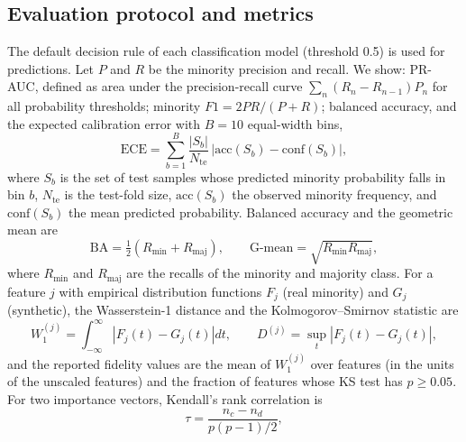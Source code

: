 \documentclass[conference]{IEEEtran}
\begin{document}
\subsection{Evaluation protocol and metrics}
The default decision rule of each classification model (threshold 0.5) is used for predictions. Let $P$ and $R$ be the minority precision and recall. We show: PR-AUC, defined as area under the precision-recall curve $\sum_n (R_n-R_{n-1})P_n$ for all probability thresholds; minority $F1 =2PR/(P+R)$; balanced accuracy, and the expected calibration error with $B=10$ equal-width bins,
\begin{equation}
\mathrm{ECE}=\sum_{b=1}^{B}\frac{|S_b|}{N_{\text{te}}}\,\big|\mathrm{acc}(S_b)-\mathrm{conf}(S_b)\big|,
\end{equation}
where $S_b$ is the set of test samples whose predicted minority probability falls in bin $b$, $N_{\text{te}}$ is the test-fold size, $\mathrm{acc}(S_b)$ the observed minority frequency, and $\mathrm{conf}(S_b)$ the mean predicted probability. Balanced accuracy and the geometric mean are
\begin{equation}
\mathrm{BA}=\tfrac{1}{2}(R_{\text{min}}+R_{\text{maj}}),\qquad \mathrm{G\text{-}mean}=\sqrt{R_{\text{min}}R_{\text{maj}}},
\end{equation}
where $R_{\text{min}}$ and $R_{\text{maj}}$ are the recalls of the minority and majority class. For a feature $j$ with empirical distribution functions $F_j$ (real minority) and $G_j$ (synthetic), the Wasserstein-1 distance and the Kolmogorov--Smirnov statistic are
\begin{equation}
W_1^{(j)}=\int_{-\infty}^{\infty}\left|F_j(t)-G_j(t)\right|dt,\qquad D^{(j)}=\sup_t\left|F_j(t)-G_j(t)\right|,
\end{equation}
and the reported fidelity values are the mean of $W_1^{(j)}$ over features (in the units of the unscaled features) and the fraction of features whose KS test has $p\ge0.05$. For two importance vectors, Kendall's rank correlation is
\begin{equation}
\tau=\frac{n_c-n_d}{p(p-1)/2},
\end{equation}
\end{document}

